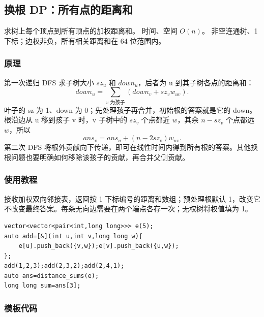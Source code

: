 \subsection{换根 DP：所有点的距离和}
\label{dp:reroot-dp}
\AlgorithmInfo
    {求树上每个顶点到所有顶点的加权距离和。}
    {时间、空间 $O(n)$。}
    {非空连通树、1 下标；边权非负，所有相关距离和在 64 位范围内。}
\subsubsection*{原理}

第一次递归 DFS 求子树大小 $sz_u$ 和 $down_u$，后者为 u 到其子树各点的距离和：
\[
 down_u=\sum_{v\text{ 为孩子}}(down_v+sz_v w_{uv}).
\]
叶子的 sz 为 1、down 为 0；先处理孩子再合并，初始根的答案就是它的 down。根沿边从 u 移到孩子 v 时，v 子树中的 $sz_v$ 个点都近 $w$，其余 $n-sz_v$ 个点都远 $w$，所以
\[
 ans_v=ans_u+(n-2sz_v)w_{uv}.
\]
第二次 DFS 将根外贡献向下传递，即可在线性时间内得到所有根的答案。其他换根问题也要明确如何移除该孩子的贡献，再合并父侧贡献。

\subsubsection*{使用教程}
 接收加权双向邻接表，返回按 1 下标编号的距离和数组；预处理根默认 1，改变它不改变最终答案。每条无向边需要在两个端点各存一次；无权树将权值填为 1。
\begin{lstlisting}[style=mtycpp,numbers=none]
vector<vector<pair<int,long long>>> e(5);
auto add=[&](int u,int v,long long w){
	e[u].push_back({v,w});e[v].push_back({u,w});
};
add(1,2,3);add(2,3,2);add(2,4,1);
auto ans=distance_sums(e);
long long sum=ans[3];
\end{lstlisting}
\subsubsection*{模板代码}
